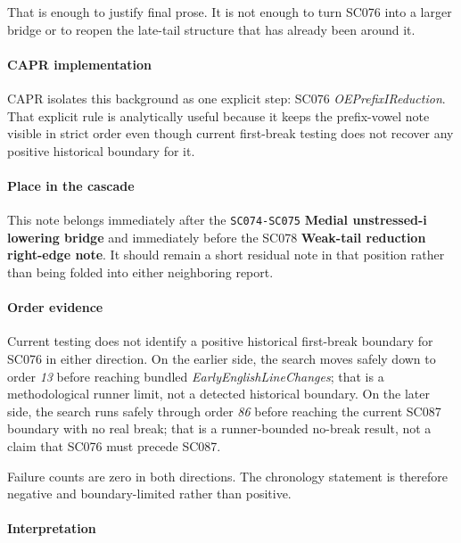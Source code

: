 \documentclass[
  british,
  a4paper,
]{article}
\begin{document}
That is enough to justify final prose. It is not enough to turn SC076
into a larger bridge or to reopen the late-tail structure that has
already been around it.

\paragraph{CAPR implementation}\label{capr-implementation-47}

CAPR isolates this background as one explicit step: SC076
\emph{OEPrefixIReduction}. That explicit rule is analytically useful
because it keeps the prefix-vowel note visible in strict order even
though current first-break testing does not recover any positive
historical boundary for it.

\paragraph{Place in the cascade}\label{place-in-the-cascade-47}

This note belongs immediately after the \texttt{SC074-SC075}
\textbf{Medial unstressed-i lowering bridge} and immediately before the
SC078 \textbf{Weak-tail reduction right-edge note}. It should remain a
short residual note in that position rather than being folded into
either neighboring report.

\paragraph{Order evidence}\label{order-evidence-47}

Current testing does not identify a positive historical first-break
boundary for SC076 in either direction. On the earlier side, the search
moves safely down to order \emph{13} before reaching bundled
\emph{EarlyEnglishLineChanges}; that is a methodological runner limit,
not a detected historical boundary. On the later side, the search runs
safely through order \emph{86} before reaching the current SC087
boundary with no real break; that is a runner-bounded no-break result,
not a claim that SC076 must precede SC087.

Failure counts are zero in both directions. The chronology statement is
therefore negative and boundary-limited rather than positive.

\paragraph{Interpretation}\label{interpretation-47}
\end{document}
